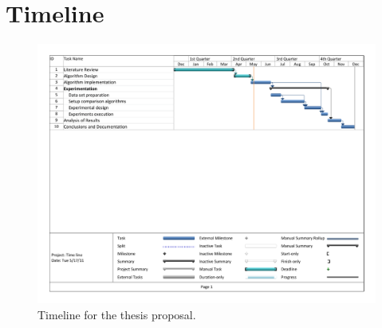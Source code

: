 \section{Timeline}
\label{sec:TheSch}
\begin{figure}[h]
	\centering
		\includegraphics[scale=0.5]{Images/Timeline.pdf}
	\caption{Timeline for the thesis proposal.}
	\label{fig:sche}
\end{figure}
